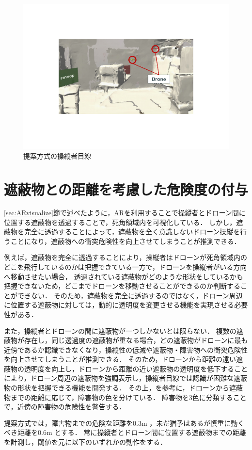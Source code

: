 \documentclass[a4paper,11pt]{ujreport}
\begin{document}
\begin{figure}[!tb]
  \centering
  \includegraphics[width=0.8\linewidth]{img/03_propose.pdf}
  \caption{提案方式の操縦者目線}
  \label{fig:03_propose}
\end{figure}


\section{遮蔽物との距離を考慮した危険度の付与}
\label{sec:DangerLevel}

\ref{sec:ARvisualize}節で述べたように，ARを利用することで操縦者とドローン間に位置する遮蔽物を透過することで，死角領域内を可視化している．
しかし，遮蔽物を完全に透過することによって，遮蔽物を全く意識しないドローン操縦を行うことになり，遮蔽物への衝突危険性を向上させてしまうことが推測できる．
\par
例えば，遮蔽物を完全に透過することにより，操縦者はドローンが死角領域内のどこを飛行しているのかは把握できている一方で，ドローンを操縦者がいる方向へ移動させたい場合，
透過されている遮蔽物がどのような形状をしているかも把握できないため，どこまでドローンを移動させることができるのか判断することができない．
そのため，遮蔽物を完全に透過するのではなく，ドローン周辺に位置する遮蔽物に対しては，動的に透明度を変更させる機能を実現させる必要性がある．

また，操縦者とドローンの間に遮蔽物が一つしかないとは限らない．
複数の遮蔽物が存在し，同じ透過度の遮蔽物が重なる場合，どの遮蔽物がドローンに最も近傍であるか認識できなくなり，操縦性の低減や遮蔽物・障害物への衝突危険性を向上させてしまうことが推測できる．
そのため，ドローンから距離の遠い遮蔽物の透明度を向上し，ドローンから距離の近い遮蔽物の透明度を低下することにより，ドローン周辺の遮蔽物を強調表示し，操縦者目線では認識が困難な遮蔽物の形状を把握できる機能を開発する．
その上，\cite{tech-01}を参考に，ドローンから遮蔽物までの距離に応じて，障害物の色を分けている．
障害物を3色に分類することで，近傍の障害物の危険性を警告する．
\par
提案方式では，障害物までの危険な距離を0.3m ，未だ猶予はあるが慎重に動くべき距離を0.6m とする．
常に操縦者とドローン間に位置する遮蔽物までの距離を計測し，閾値を元に以下のいずれかの動作をする．
\end{document}

